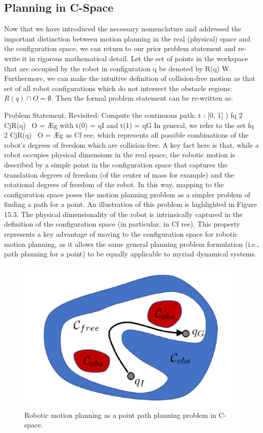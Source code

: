 \documentclass[twoside]{article}
\begin{document}
\subsection{ Planning in C-Space }
Now that we have introduced the necessary nomenclature and addressed the important distinction between motion planning in the real (physical) space and the configuration space, we can return to our prior problem statement and re-write it in rigorous mathematical detail. Let the set of points in the workspace that are occupied by the robot in configuration q be denoted by R(q) W. Furthermore, we can make the intuitive definition of collision-free motion as that set of all robot configurations which do not intersect the obstacle regions: $R(q)\cap O = \emptyset$. Then the formal problem statement can be re-written as: 

Problem Statement, Revisited:
Compute the continuous path: t : [0, 1] ) fq 2 CjR(q) \ O = Æg with t(0) = qI and t(1) = qG In general, we refer to the set fq 2 CjR(q) \ O = Æg as Cf ree, which represents all possible combinations of the robot’s degrees of freedom which are collision-free. A key fact here is that, while a robot occupies physical dimensions in the real space, the robotic motion is described by a simple point in the configuration space that captures the translation degrees of freedom (of the center of mass for example) and the rotational degrees of freedom of the robot. In this way, mapping to the configuration space poses the motion planning problem as a simpler problem of finding a path for a point. An illustration of this problem is highlighted in Figure 15.3. The physical dimensionality of the robot is intrinsically captured in the definition of the configuration space (in particular, in Cf ree). This property represents a key advantage
of moving to the configuration space for robotic motion planning, as it allows the same general planning problem formulation (i.e., path planning for a point) to be equally applicable to myriad dynamical systems.

\begin{figure}[h]
\begin{center}
\includegraphics{fig15_3.PNG}
\caption{Robotic motion planning as a point path planning problem in C-space.}
\end{center}
\end{figure}
\end{document}
